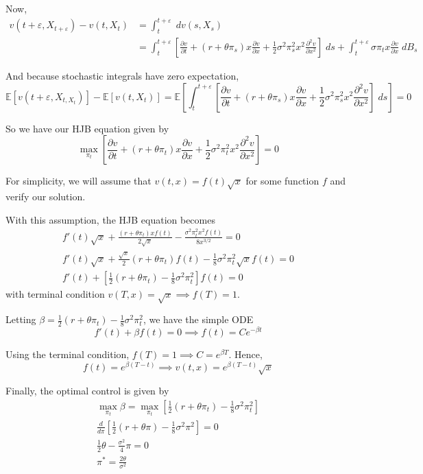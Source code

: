 \documentclass[12pt]{article}
\newcommand{\E}{\mathbb{E}}
\newcommand{\ep}{\varepsilon}
\begin{document}
        Now, 
        \begin{align*}
            v(t + \ep, X_{t + \ep}) - v(t, X_t) &= \int_{t}^{t + \ep} \; dv(s, X_s)\\ 
                &= \int_{t}^{t + \ep} \left[\frac{\partial v}{\partial t} + (r + \theta \pi_s)x \frac{\partial v}{\partial x} + \frac{1}{2} \sigma^2 \pi_s^2x^2 \frac{\partial^2 v}{\partial x^2}\right] \; ds + \int_t^{t + \ep} \sigma \pi_t x\frac{\partial v}{\partial x} \; dB_s
        \end{align*}
        
        And because stochastic integrals have zero expectation, 
        \[\E[v(t + \ep, X_{t, X_t})] - \E[v(t, X_t)] = \E\left[\int_{t}^{t + \ep} \left[\frac{\partial v}{\partial t} + (r + \theta \pi_s) x\frac{\partial v}{\partial x} + \frac{1}{2} \sigma^2 \pi_s^2 x^2 \frac{\partial^2 v}{\partial x^2}\right] \; ds\right] = 0\]

        So we have our HJB equation given by 
        \[\max_{\pi_t} \left[\frac{\partial v}{\partial t} + (r + \theta \pi_t) x\frac{\partial v}{\partial x} + \frac{1}{2} \sigma^2 \pi_t^2 x^2\frac{\partial^2 v}{\partial x^2}\right] = 0\]

        For simplicity, we will assume that $v(t, x) = f(t)\sqrt{x}$ for some function $f$ and verify our solution. 

        With this assumption, the HJB equation becomes
        \begin{gather*}
            f'(t)\sqrt{x} + \frac{(r + \theta \pi_t)x f(t)}{2\sqrt{x}} -  \frac{\sigma^2 \pi_t^2 x^2f(t)}{8x^{3/2}} = 0\\ 
            f'(t)\sqrt{x} + \frac{\sqrt x}{2}(r + \theta \pi_t)f(t) -\frac{1}{8} \sigma^2 \pi_t^2 \sqrt{x} f(t) = 0\\ 
            f'(t) + \left[\frac{1}{2}(r + \theta \pi_t) - \frac{1}{8}\sigma^2 \pi_t^2\right]f(t) = 0
        \end{gather*}
        with terminal condition $v(T, x) = \sqrt{x} \implies f(T) = 1$.

        Letting $\beta = \frac{1}{2}(r + \theta \pi_t) - \frac{1}{8}\sigma^2 \pi_t^2$, we have the simple ODE 
        \[f'(t) + \beta f(t) = 0 \implies f(t) = Ce^{-\beta t}\]
        
        Using the terminal condition, $f(T) = 1 \implies C = e^{\beta T}$. Hence,
        \[f(t) = e^{\beta(T - t)} \implies \boxed{v(t, x) = e^{\beta(T - t)}\sqrt{x}}\] 

        Finally, the optimal control is given by 
        \begin{gather*}
            \max_{\pi_t} \beta = \max_{\pi_t}\left[\frac{1}{2}(r + \theta \pi_t) - \frac{1}{8}\sigma^2 \pi_t^2\right]\\ 
            \frac{d}{d\pi}\left[\frac{1}{2}(r + \theta \pi) - \frac{1}{8}\sigma^2 \pi^2\right] = 0\\
            \frac{1}{2}\theta - \frac{\sigma^2}{4} \pi = 0\\ 
            \boxed{\pi^* = \frac{2\theta}{\sigma^2}}
        \end{gather*}
\end{document}
